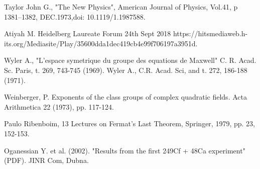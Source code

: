 \documentclass[a4paper,9pt]{article}
\begin{document}
\begin{thebibliography}{99}
 Taylor John G., "The New Physics", American Journal of Physics, Vol.41, p 1381--1382, DEC.1973,doi: 10.1119/1.1987588. 

 Atiyah M. Heidelberg Laureate Forum 24th Sept 2018 https://hitsmediaweb.h-its.org/Mediasite/Play/35600dda1dec419cb4e99f706197a3951d.




 Wyler A., "L'espace symetrique du groupe des equations de Maxwell" C. R. Acad. Sc. Paris, t. 269, 743-745 (1969). Wyler A., C.R. Acad. Sci, and t. 272, 186-188 (1971).













 Weinberger, P. Exponents of the class groups of complex quadratic fields. Acta Arithmetica 22 (1973), pp. 117-124.



 Paulo Ribenboim, 13 Lectures on Fermat's Last Theorem, Springer, 1979, pp. 23, 152-153.

 Oganessian Y. et al. (2002). "Results from the first 249Cf + 48Ca experiment" (PDF). JINR Com, Dubna.


\end{thebibliography}
\end{document}
